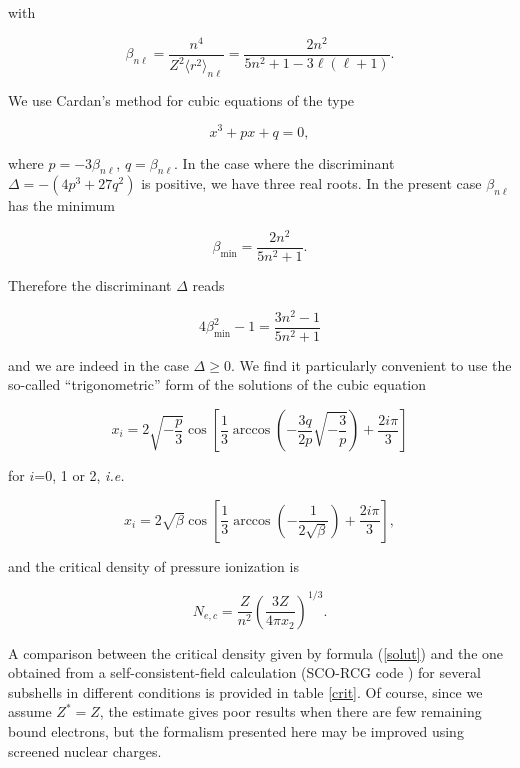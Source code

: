 \documentclass[a4paper,10pt]{article}
\begin{document}
\noindent with 

\begin{equation*}
\beta_{n\ell}=\frac{n^4}{Z^2\langle r^2\rangle_{n\ell}}=\frac{2n^2}{5n^2+1-3\ell(\ell+1)}.
\end{equation*}

\noindent We use Cardan's method for cubic equations of the type

\begin{equation*}
x^3+px+q=0,
\end{equation*}

\noindent where $p=-3\beta_{n\ell}$, $q=\beta_{n\ell}$. In the case where the discriminant $\Delta=-(4p^3+27q^2)$ is positive, we have three real roots. In the present case $\beta_{n\ell}$ has the minimum

\begin{equation*}
\beta_{\mathrm{min}}=\frac{2n^2}{5n^2+1}.
\end{equation*}

\noindent Therefore the discriminant $\Delta$ reads

\begin{equation*}
4\beta_{\mathrm{min}}^2-1=\frac{3n^2-1}{5n^2+1}
\end{equation*}

\noindent and we are indeed in the case $\Delta\geq 0$. We find it particularly convenient to use the so-called ``trigonometric'' form of the solutions of the cubic equation

\begin{equation*}
x_i=2\sqrt{-\frac{p}{3}}\cos\left[\frac{1}{3}\arccos\left(-\frac{3q}{2p}\sqrt{-\frac{3}{p}}\right)+\frac{2i\pi}{3}\right]
\end{equation*}

\noindent for $i$=0, 1 or 2, \textit{i.e.}

\begin{equation*}
x_i=2\sqrt{\beta}\cos\left[\frac{1}{3}\arccos\left(-\frac{1}{2\sqrt{\beta}}\right)+\frac{2i\pi}{3}\right],
\end{equation*}

\noindent and the critical density of pressure ionization is

\begin{equation}\label{solut}
N_{e,c}=\frac{Z}{n^2}\left(\frac{3Z}{4\pi x_2}\right)^{1/3}.
\end{equation}

\noindent A comparison between the critical density given by formula (\ref{solut}) and the one obtained from a self-consistent-field calculation (SCO-RCG code \cite{PAIN15}) for several subshells in different conditions is provided in table \ref{crit}. Of course, since we assume $Z^*=Z$, the estimate gives poor results when there are few remaining bound electrons, but the formalism presented here may be improved using screened nuclear charges.
\end{document}
